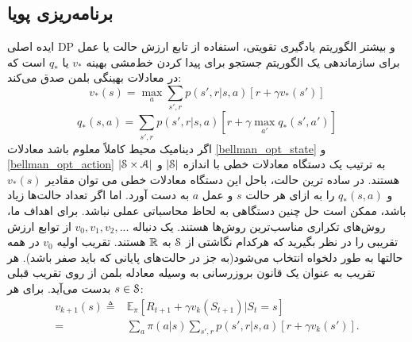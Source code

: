 \subsection{برنامه‌ریزی پویا}


ایده اصلی DP و بیشتر الگوریتم یادگیری تقویتی‌، استفاده از تابع ارزش حالت یا عمل برای سازماندهی یک الگوریتم جستجو برای پیدا کردن خط‌مشی بهینه
$v_*$
یا
$q_*$
است
که در معادلات بهینگی بلمن صدق می‌کند:
\begin{equation}
v_{*}(s) = \max_{a} \sum_{s',r} p(s',r | s,a)[r + \gamma v_*(s')]
\label{bellman_opt_state}
\end{equation}
\begin{equation}
q_{*}(s,a) = \sum_{s',r} p(s',r | s,a)[r + \gamma \max_{a'} q_* (s',a')]
\label{bellman_opt_action}
\end{equation}
اگر دینامیک محیط کاملاً معلوم باشد معادلات
\ref{bellman_opt_state}
و
\ref{bellman_opt_action}
به ترتیب یک دستگاه معادلات خطی با اندازه
 $|\EuScript{S}|$
 و
 $|\EuScript{S} \times \EuScript{A}|$
  هستند.
در ساده ترین حالت، باحل این دستگاه معادلات  خطی می توان  مقادیر 
$v_*(s)$
و
$q_*(s,a)$
را به ازای هر حالت $s$ و عمل $a$ به دست آورد. اما اگر تعداد حالت‌ها زیاد باشد، ممکن است حل چنین دستگاهی به لحاظ محاسباتی عملی نباشد. برای اهداف ما، روش‌های تکراری مناسب‌ترین روش‌ها هستند. یک دنباله $ v_0 , v_1 , v_2 , ...$ 
از توابع ارزش تقریبی
را در نظر بگیرید که هرکدام نگاشتی از
$\EuScript{S}$ 
به 
$\mathbb{R}$
 هستند.
تقریب اولیه $v_0$
در همه حالت\nf ها
به طور دلخواه انتخاب می‌شود(به جز در حالت‌های پایانی که باید صفر باشد). هر تقریب به عنوان یک قانون بروزرسانی به وسیله معادله بلمن از روی تقریب قبلی بدست می‌آید. برای هر 
$s \in \EuScript{S}$:
\begin{align}
v_{k+1}(s) \triangleq & \mathbb{E}_{\pi} [R_{t+1} + \gamma v_k(S_{t+1}) | S_t=s]  \nonumber \\
=& \sum_{a} \pi(a|s) \sum_{s',r} p(s',r | s,a)[r + \gamma v_k(s')].
\end{align}

